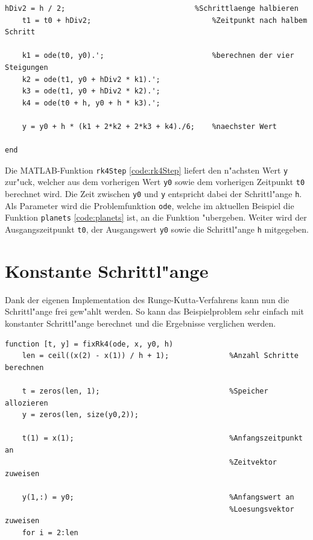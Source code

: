 \begin{refsection}
\begin{lstlisting}[style=MATLAB, caption=Runge-Kutta-Schritt, captionpos=b, label=code:rk4Step]
    hDiv2 = h / 2;                              %Schrittlaenge halbieren
    t1 = t0 + hDiv2;                            %Zeitpunkt nach halbem Schritt

    k1 = ode(t0, y0).';                         %berechnen der vier Steigungen
    k2 = ode(t1, y0 + hDiv2 * k1).';               
    k3 = ode(t1, y0 + hDiv2 * k2).';
    k4 = ode(t0 + h, y0 + h * k3).';
    
    y = y0 + h * (k1 + 2*k2 + 2*k3 + k4)./6;    %naechster Wert

end
\end{lstlisting}

Die MATLAB-Funktion \texttt{rk4Step} \ref{code:rk4Step} liefert den n"achsten Wert \texttt{y} zur"uck, welcher aus dem vorherigen Wert \texttt{y0} sowie dem vorherigen Zeitpunkt \texttt{t0} berechnet wird.
Die Zeit zwischen \texttt{y0} und \texttt{y} entspricht dabei der Schrittl"ange \texttt{h}.
Als Parameter wird die Problemfunktion \texttt{ode}, welche im aktuellen Beispiel die Funktion \texttt{planets} \ref{code:planets} ist, an die Funktion "ubergeben.
Weiter wird der Ausgangszeitpunkt \texttt{t0}, der Ausgangswert \texttt{y0} sowie die Schrittl"ange \texttt{h} mitgegeben.
 
\section{Konstante Schrittl"ange}

Dank der eigenen Implementation des Runge-Kutta-Verfahrens kann nun die Schrittl"ange frei gew"ahlt werden.
So kann das Beispielproblem sehr einfach mit konstanter Schrittl"ange berechnet und die Ergebnisse verglichen werden. 
\begin{lstlisting}[style=MATLAB, caption=Konstante Schrittl"ange, captionpos=b, label=code:fixRk4] 
function [t, y] = fixRk4(ode, x, y0, h)                 
    len = ceil((x(2) - x(1)) / h + 1);              %Anzahl Schritte berechnen

    t = zeros(len, 1);                              %Speicher allozieren
    y = zeros(len, size(y0,2));

    t(1) = x(1);                                    %Anfangszeitpunkt an
                                                    %Zeitvektor zuweisen
                                                        
    y(1,:) = y0;                                    %Anfangswert an
                                                    %Loesungsvektor zuweisen
    for i = 2:len
  

\end{lstlisting}
\end{refsection}
